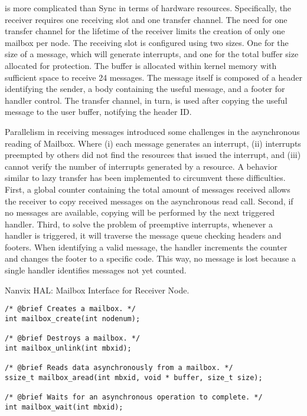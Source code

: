 					\mailbox is more complicated than Sync in terms of hardware resources.
					Specifically, the receiver requires one \dnoc receiving slot and one \cnoc
					transfer channel. The need for one transfer channel for the lifetime
					of the receiver limits the creation of only one mailbox per \noc node.
					The receiving slot is configured using two sizes. One for the size of
					a message, which will generate interrupts, and one for the total buffer
					size allocated for protection. The buffer is allocated within kernel
					memory with sufficient space to receive 24 messages. The message
					itself is composed of a header identifying the sender, a body containing
					the useful message, and a footer for handler control. The transfer channel,
					in turn, is used after copying the useful message to the user buffer,
					notifying the header ID.
					
					Parallelism in receiving messages introduced some challenges in the
					asynchronous reading of Mailbox. Where (i) each message generates an
					interrupt, (ii) interrupts preempted by others did not find the \dnoc
					resources that issued the interrupt, and (iii) cannot verify the
					number of interrupts generated by a resource. A behavior similar to
					lazy transfer has been implemented to circumvent these difficulties.
					First, a global counter containing the total amount of messages
					received allows the receiver to copy received messages on the
					asynchronous read call. Second, if no messages are available, copying
					will be performed by the next triggered handler. Third, to solve the
					problem of preemptive interrupts, whenever a handler is triggered,
					it will traverse the message queue checking headers and footers.
					When identifying a valid message, the handler increments the counter
					and changes the footer to a specific code. This way, no message is
					lost because a single handler identifies messages not yet counted.

\begin{listing}[!tb]
\caption{Nanvix HAL: Mailbox Interface for Receiver Node.}
\label{code:hal-mailbox-receiver}
\begin{verbatim}
/* @brief Creates a mailbox. */
int mailbox_create(int nodenum);

/* @brief Destroys a mailbox. */
int mailbox_unlink(int mbxid);

/* @brief Reads data asynchronously from a mailbox. */
ssize_t mailbox_aread(int mbxid, void * buffer, size_t size);

/* @brief Waits for an asynchronous operation to complete. */
int mailbox_wait(int mbxid);
\end{verbatim}
\end{listing}

